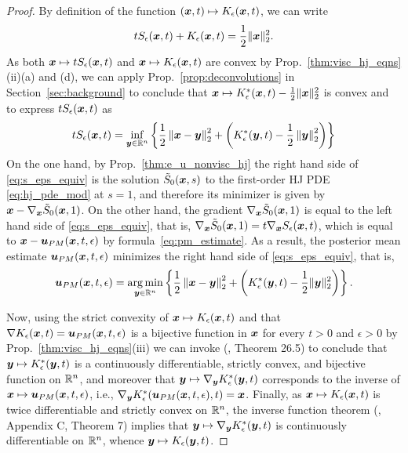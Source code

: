 \begin{proof}
By definition of the function $(\boldsymbol{x},t) \mapsto K_{\epsilon}(\boldsymbol{x},t)$, we can write
\begin{equation*}
    tS_\epsilon(\boldsymbol{x},t) + K_\epsilon(\boldsymbol{x},t) = \frac{1}{2}\Vert \boldsymbol{x} \Vert_{2}^{2}.
\end{equation*}
As both $\boldsymbol{x} \mapsto tS_\epsilon(\boldsymbol{x},t)$ and $\boldsymbol{x} \mapsto K_\epsilon(\boldsymbol{x},t)$ are convex by Prop.~\ref{thm:visc_hj_eqns}(ii)(a) and (d), we can apply Prop.~\ref{prop:deconvolutions} in Section~\ref{sec:background} to conclude that $\boldsymbol{x} \mapsto K^{*}_{\epsilon}(\boldsymbol{x},t)-\frac{1}{2}\Vert \boldsymbol{x} \Vert_{2}^{2}$ is convex and to express $tS_\epsilon(\boldsymbol{x},t)$ as
\begin{equation} \label{eq:s_eps_equiv}
    tS_\epsilon(\boldsymbol{x},t) = \inf_{\boldsymbol{y} \in \mathbb{R}^n}\left\{\frac{1}{2}\left \Vert \boldsymbol{x} - \boldsymbol{y} \right \Vert_{2}^{2} + \left(K^{*}_{\epsilon}(\boldsymbol{y},t) - \frac{1}{2}\left \Vert \boldsymbol{y} \right \Vert_{2}^{2}\right)\right\}
\end{equation}
On the one hand, by Prop.~\ref{thm:e_u_nonvisc_hj} the right hand side of \eqref{eq:s_eps_equiv} is the solution $\tilde{S}_0(\boldsymbol{x},s)$ to the first-order HJ PDE \eqref{eq:hj_pde_mod} at $s = 1$, and therefore its minimizer is given by $\boldsymbol{x} - \nabla_{\boldsymbol{x}}\tilde{S}_0(\boldsymbol{x},1)$. On the other hand, the gradient $\nabla_{\boldsymbol{x}}\tilde{S}_0(\boldsymbol{x},1)$ is equal to the left hand side of \eqref{eq:s_eps_equiv}, that is, $\nabla_{\boldsymbol{x}}\tilde{S}_0(\boldsymbol{x},1) = t\nabla_{\boldsymbol{x}}S_\epsilon(\boldsymbol{x},t)$, which is equal to $\boldsymbol{x} - \boldsymbol{u}_{PM}(\boldsymbol{x},t,\epsilon)$ by formula~\eqref{eq:pm_estimate}. As a result, the posterior mean estimate $\boldsymbol{u}_{PM}(\boldsymbol{x},t,\epsilon)$ minimizes the right hand side of \eqref{eq:s_eps_equiv}, that is, 
\begin{equation*}
\boldsymbol{u}_{PM}(\boldsymbol{x},t,\epsilon) = \operatorname*{arg\,min}_{\boldsymbol{y}\in\mathbb{R}^n}\left\{ \frac{1}{2}\left\Vert \boldsymbol{x}-\boldsymbol{y}\right\Vert _{2}^{2} + \left(K^{*}_{\epsilon}(\boldsymbol{y},t)-\frac{1}{2}\Vert \boldsymbol{y} \Vert_{2}^{2}\right)\right\}.
\end{equation*}

Now, using the strict convexity of $\boldsymbol{x} \mapsto K_{\epsilon}(\boldsymbol{x},t)$ and that $\nabla K_\epsilon(\boldsymbol{x},t) = \boldsymbol{u}_{PM}(\boldsymbol{x},t,\epsilon)$ is a bijective function in $\boldsymbol{x}$ for every $t>0$ and $\epsilon>0$ by Prop.~\ref{thm:visc_hj_eqns}(iii) we can invoke (\cite{rockafellar1970convex}, Theorem 26.5) to conclude that $\boldsymbol{y} \mapsto K^{*}_{\epsilon}(\boldsymbol{y},t)$ is a continuously differentiable, strictly convex, and bijective function on $\mathbb{R}^n$, and moreover that $\boldsymbol{y} \mapsto \nabla_{\boldsymbol{y}}K^{*}_{\epsilon}(\boldsymbol{y},t)$ corresponds to the inverse of $\boldsymbol{x}\mapsto\boldsymbol{u}_{PM}(\boldsymbol{x},t,\epsilon)$, i.e., $\nabla_{\boldsymbol{y}}K^{*}_{\epsilon}(\boldsymbol{u}_{PM}(\boldsymbol{x},t,\epsilon),t) = \boldsymbol{x}$. Finally, as $\boldsymbol{x} \mapsto K_{\epsilon}(\boldsymbol{x},t)$ is twice differentiable and strictly convex on $\mathbb{R}^n$, the inverse function theorem (\cite{evans1998partial}, Appendix C, Theorem 7) implies that $\boldsymbol{y} \mapsto \nabla_{\boldsymbol{y}}K^{*}_{\epsilon}(\boldsymbol{y},t)$ is continuously differentiable on $\mathbb{R}^n$, whence $\boldsymbol{y} \mapsto K_\epsilon(\boldsymbol{y},t)$.
\end{proof}